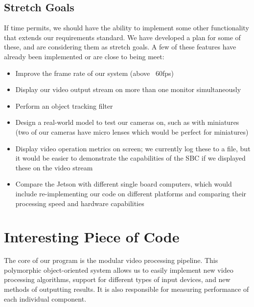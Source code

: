\documentclass[letterpaper,10pt,titlepage]{IEEEtran}
\begin{document}
	\subsection{Stretch Goals}
	If time permits, we should have the ability to implement some other functionality that extends our requirements standard. We have developed a plan for some of these, and are considering them as stretch goals. A few of these features have already been implemented or are close to being meet:\\
	\begin{itemize}
		\item Improve the frame rate of our system (above ~60fps)
		\item Display our video output stream on more than one monitor simultaneously  
		\item Perform an object tracking filter
		\item Design a real-world model to test our cameras on, such as with miniatures (two of our cameras have micro lenses which would be perfect for miniatures)
		\item Display video operation metrics on screen; we currently log these to a file, but it would be easier to demonstrate the capabilities of the SBC if we displayed these on the video stream
		\item Compare the Jetson with different single board computers, which would include re-implementing our code on different platforms and comparing their processing speed and hardware capabilities\\
	\end{itemize}
	
   \section{Interesting Piece of Code}
   The core of our program is the modular video processing pipeline. This polymorphic object-oriented system allows us to easily implement new video processing algorithms, support for different types of input devices, and new methods of outputting results. It is also responsible for measuring performance of each individual component.\\
   
\end{document}
